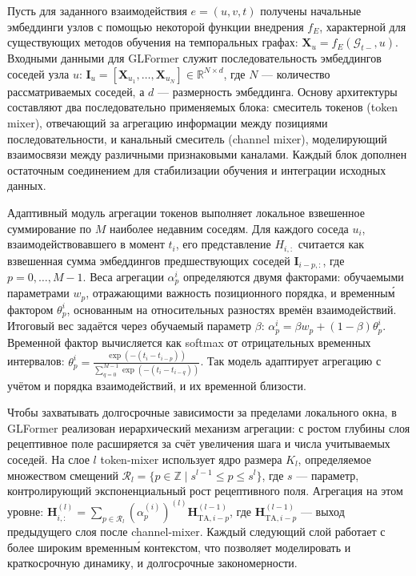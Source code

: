 \documentclass[a4paper,12pt]{extarticle}
\begin{document}
Пусть для заданного взаимодействия \(e = (u, v, t)\) получены начальные эмбеддинги узлов с помощью некоторой функции внедрения \(f_E\), характерной для существующих методов обучения на темпоральных графах: \(\mathbf{X}_u = f_E(\mathcal{G}_{t-}, u)\). Входными данными для GLFormer служит последовательность эмбеддингов соседей узла \(u\): \(\mathbf{I}_u = [\mathbf{X}_{u_1}, \dots, \mathbf{X}_{u_N}] \in \mathbb{R}^{N \times d}\), где \(N\) — количество рассматриваемых соседей, а \(d\) — размерность эмбеддинга. Основу архитектуры составляют два последовательно применяемых блока: смеситель токенов (token mixer), отвечающий за агрегацию информации между позициями последовательности, и канальный смеситель (channel mixer), моделирующий взаимосвязи между различными признаковыми каналами. Каждый блок дополнен остаточным соединением для стабилизации обучения и интеграции исходных данных.

Адаптивный модуль агрегации токенов выполняет локальное взвешенное суммирование по \(M\) наиболее недавним соседям. Для каждого соседа \(u_i\), взаимодействовавшего в момент \(t_i\), его представление \(H_{i,:}\) считается как взвешенная сумма эмбеддингов предшествующих соседей \(\mathbf{I}_{i-p,:}\), где \(p = 0, \dots, M-1\). Веса агрегации \(\alpha_p^i\) определяются двумя факторами: обучаемыми параметрами \(w_p\), отражающими важность позиционного порядка, и временны\'{м} фактором \(\theta_p^i\), основанным на относительных разностях времён взаимодействий. Итоговый вес задаётся через обучаемый параметр \(\beta\): \(\alpha_p^i = \beta w_p + (1-\beta)\theta_p^i\). Временной фактор вычисляется как softmax от отрицательных временных интервалов: \(\theta_p^i = \frac{\exp(-(t_i - t_{i-p}))}{\sum_{q=0}^{M-1}\exp(-(t_i - t_{i-q}))}\). Так модель адаптирует агрегацию с учётом и порядка взаимодействий, и их временной близости.

Чтобы захватывать долгосрочные зависимости за пределами локального окна, в GLFormer реализован иерархический механизм агрегации: с ростом глубины слоя рецептивное поле расширяется за счёт увеличения шага и числа учитываемых соседей. На слое \(l\) token-mixer использует ядро размера \(K_l\), определяемое множеством смещений \(\mathcal{R}_l = \{p \in \mathbb{Z} \mid s^{l-1} \leq p \leq s^l\}\), где \(s\) --- параметр, контролирующий экспоненциальный рост рецептивного поля. Агрегация на этом уровне: \(\mathbf{H}_{i,:}^{(l)} = \sum_{p \in \mathcal{R}_l} (\alpha_p^{(i)})^{(l)} \mathbf{H}_{\mathrm{TA}, i-p}^{(l-1)}\), где \(\mathbf{H}_{\mathrm{TA}, i-p}^{(l-1)}\) --- выход предыдущего слоя после channel-mixer. Каждый следующий слой работает с более широким временны\'{м} контекстом, что позволяет моделировать и краткосрочную динамику, и долгосрочные закономерности.
\end{document}
